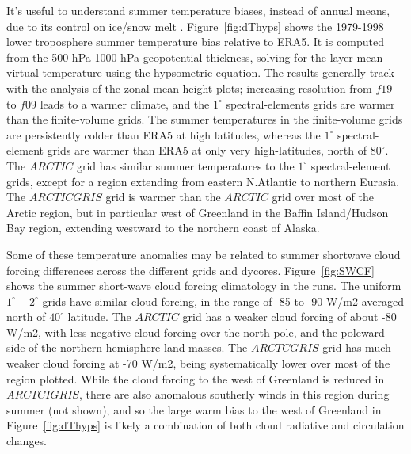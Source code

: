 \documentclass[draft]{agujournal2019}
\begin{document}
It's useful to understand summer temperature biases, instead of annual means, due to its control on ice/snow melt \cite{O2001JAM,HT2008Paleo}. Figure~\ref{fig:dThyps} shows the 1979-1998 lower troposphere summer temperature bias relative to ERA5. It is computed from the 500 hPa-1000 hPa geopotential thickness, solving for the layer mean virtual temperature using the hypsometric equation. The results generally track with the analysis of the zonal mean height plots; increasing resolution from $f19$ to $f09$ leads to a warmer climate, and the $1^{\circ}$ spectral-elements grids are warmer than the finite-volume grids. The summer temperatures in the finite-volume grids are persistently colder than ERA5 at high latitudes, whereas the $1^{\circ}$ spectral-element grids are warmer than ERA5 at only very high-latitudes, north of $80^{\circ}$. The $ARCTIC$ grid has similar summer temperatures to the $1^{\circ}$ spectral-element grids, except for a region extending from eastern N.Atlantic to northern Eurasia. The $ARCTICGRIS$ grid is warmer than the $ARCTIC$ grid over most of the Arctic region, but in particular west of Greenland in the Baffin Island/Hudson Bay region, extending westward to the northern coast of Alaska.

Some of these temperature anomalies may be related to summer shortwave cloud forcing differences across the different grids and dycores. Figure~\ref{fig:SWCF} shows the summer short-wave cloud forcing climatology in the runs. The uniform $1^{\circ}-2^{\circ}$ grids have similar cloud forcing, in the range of -85 to -90 W/m2 averaged north of $40^{\circ}$ latitude. The $ARCTIC$ grid has a weaker cloud forcing of about -80 W/m2, with less negative cloud forcing over the north pole, and the poleward side of the northern hemisphere land masses. The $ARCTCGRIS$ grid has much weaker cloud forcing at -70 W/m2, being systematically lower over most of the region plotted. While the cloud forcing to the west of Greenland is reduced in $ARCTCIGRIS$, there are also anomalous southerly winds in this region during summer (not shown), and so the large warm bias to the west of Greenland in Figure~\ref{fig:dThyps} is likely a combination of both cloud radiative and circulation changes. 
\end{document}
